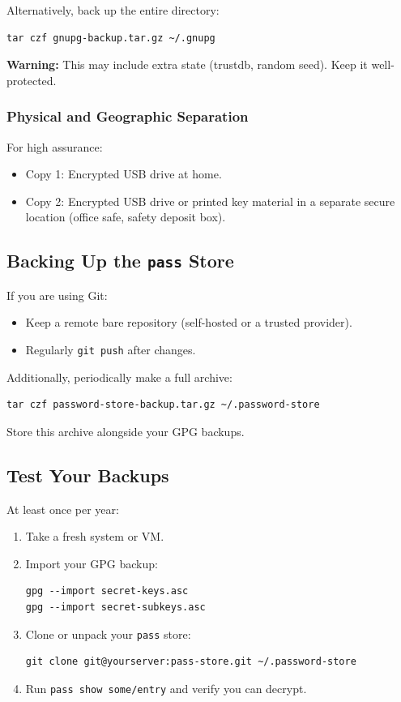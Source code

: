 \documentclass[11pt,a4paper]{article}
\newcommand{\cmd}[1]{\texttt{#1}}
\begin{document}
Alternatively, back up the entire directory:

\begin{verbatim}
tar czf gnupg-backup.tar.gz ~/.gnupg
\end{verbatim}

\textbf{Warning:} This may include extra state (trustdb, random seed). Keep it well-protected.

\subsubsection{Physical and Geographic Separation}

For high assurance:

\begin{itemize}[noitemsep]
  \item Copy 1: Encrypted USB drive at home.
  \item Copy 2: Encrypted USB drive or printed key material in a separate secure location (office safe, safety deposit box).
\end{itemize}

\subsection{Backing Up the \texttt{pass} Store}

If you are using Git:

\begin{itemize}[noitemsep]
  \item Keep a remote bare repository (self-hosted or a trusted provider).
  \item Regularly \cmd{git push} after changes.
\end{itemize}

Additionally, periodically make a full archive:

\begin{verbatim}
tar czf password-store-backup.tar.gz ~/.password-store
\end{verbatim}

Store this archive alongside your GPG backups.

\subsection{Test Your Backups}

At least once per year:

\begin{enumerate}[noitemsep]
  \item Take a fresh system or VM.
  \item Import your GPG backup:
\begin{verbatim}
gpg --import secret-keys.asc
gpg --import secret-subkeys.asc
\end{verbatim}
  \item Clone or unpack your \texttt{pass} store:
\begin{verbatim}
git clone git@yourserver:pass-store.git ~/.password-store
\end{verbatim}
  \item Run \cmd{pass show some/entry} and verify you can decrypt.
\end{enumerate}
\end{document}
